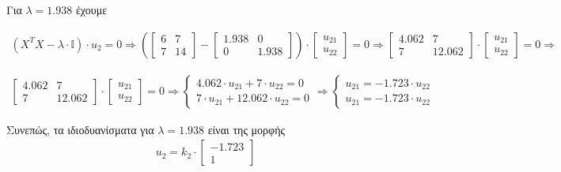 \documentclass{article}
\begin{document}
	Για $λ = 1.938$ έχουμε
	
	\begin{align*}
		(X^TX - λ \cdot \mathbb{I}) \cdot u_{2} = 0 \Rightarrow
		\left(	
		\begin{bmatrix}
			6 & 7 \\
			7 & 14 
		\end{bmatrix} - 
		\begin{bmatrix}
			1.938 & 0 \\
			0 & 1.938 
		\end{bmatrix}
		\right) 
		\cdot
		\begin{bmatrix}
			u_{21} \\
			u_{22} 
		\end{bmatrix} = 0 \Rightarrow	
		\begin{bmatrix}
			4.062 & 7 \\
			7 & 12.062
		\end{bmatrix} 
		\cdot
		\begin{bmatrix}
			u_{21} \\
			u_{22} 
		\end{bmatrix} = 0 \Rightarrow
	\end{align*}

	\begin{align*}	
		\begin{bmatrix}
			4.062 & 7 \\
			7 & 12.062
		\end{bmatrix} 
		\cdot
		\begin{bmatrix}
			u_{21} \\
			u_{22} 
		\end{bmatrix} = 0 \Rightarrow
		\begin{cases}
			4.062 \cdot u_{21} + 7 \cdot u_{22} = 0 \\
			7 \cdot u_{21} + 12.062 \cdot u_{22} = 0
		\end{cases} \Rightarrow
		\begin{cases}
			u_{21} = -1.723 \cdot u_{22} \\
			u_{21} = -1.723 \cdot u_{22}
		\end{cases}
	\end{align*}

	\noindent
	Συνεπώς, τα ιδιοδυανίσματα για $λ = 1.938$ είναι της μορφής 
	\begin{align*}	
		u_{2} = k_{2} \cdot
		\begin{bmatrix}
			-1.723 \\
			1 
		\end{bmatrix}
	\end{align*}
	
\end{document}
